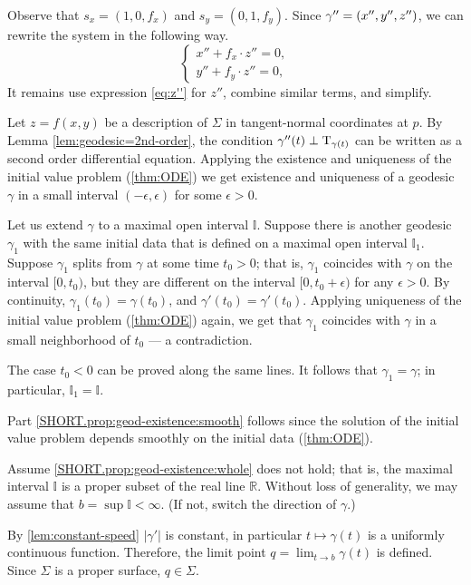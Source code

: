 Observe that 
$s_x=(1,0, f_x)$ 
and 
$s_y=(0,1, f_y)$.
Since $\gamma''\z=(x'',y'',z'')$, we can rewrite the system in the following way.
\[
\begin{cases}
x''+ f_x\cdot z''=0,
\\
y''+ f_y\cdot z''=0,
\end{cases}
\]
It remains use expression \ref{eq:z''} for $z''$, combine similar terms, and simplify.
\qeds


Let $z=f(x,y)$ be a description of $\Sigma$ in tangent-normal coordinates at $p$.
By Lemma \ref{lem:geodesic=2nd-order}, the condition $\gamma''(t)\perp\mathrm{T}_{\gamma(t)}$ can be written as a second order differential equation.
Applying the existence and uniqueness of the initial value problem (\ref{thm:ODE}) we get existence and uniqueness of a geodesic $\gamma$ in a small interval $(-\epsilon,\epsilon)$ for some $\epsilon>0$.

Let us extend $\gamma$ to a maximal open interval $\mathbb{I}$.
Suppose there is another geodesic $\gamma_1$ with the same initial data that is defined on a maximal open interval $\mathbb{I}_1$.
Suppose $\gamma_1$ splits from $\gamma$ at some time $t_0>0$;
that is, $\gamma_1$ coincides with $\gamma$ on the interval $[0,t_0)$, but they are different on the interval $[0,t_0+\epsilon)$ for any $\epsilon>0$.
By continuity, $\gamma_1(t_0)=\gamma(t_0)$, and $\gamma'(t_0)=\gamma'(t_0)$.
Applying uniqueness of the initial value problem (\ref{thm:ODE}) again, we get that $\gamma_1$ coincides with $\gamma$ in a small neighborhood of $t_0$ --- a contradiction.

The case $t_0<0$ can be proved along the same lines.
It follows that $\gamma_1=\gamma$;
in particular, $\mathbb{I}_1=\mathbb{I}$.

Part \ref{SHORT.prop:geod-existence:smooth} follows since the solution of the initial value problem depends smoothly on the initial data (\ref{thm:ODE}).

Assume \ref{SHORT.prop:geod-existence:whole} does not hold;
that is, the maximal interval $\mathbb{I}$ is a proper subset of the real line $\mathbb{R}$.
Without loss of generality, we may assume that $b=\sup\mathbb{I}<\infty$.
(If not, switch the direction of $\gamma$.)

By \ref{lem:constant-speed} $|\gamma'|$ is constant, in particular $t\mapsto \gamma(t)$ is a uniformly continuous function.
Therefore, the limit point
$q=\lim_{t\to b}\gamma(t)$
is defined.
Since $\Sigma$ is a proper surface, $q\in \Sigma$. 

